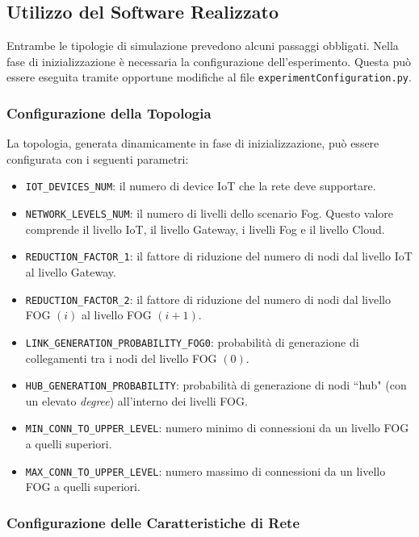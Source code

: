 \subsection{Utilizzo del Software Realizzato}

Entrambe le tipologie di simulazione prevedono alcuni passaggi obbligati. Nella fase di inizializzazione è necessaria la configurazione dell'esperimento. Questa può essere eseguita tramite opportune modifiche al file \texttt{\justify experimentConfiguration.py}.

\subsubsection{Configurazione della Topologia}

La topologia, generata dinamicamente in fase di inizializzazione, può essere configurata con i seguenti parametri:
\begin{itemize}
	\item \texttt{IOT\_DEVICES\_NUM}: il numero di device IoT che la rete deve supportare.
	\item \texttt{NETWORK\_LEVELS\_NUM}: il numero di livelli dello scenario Fog. Questo valore comprende il livello IoT, il livello Gateway, i livelli Fog e il livello Cloud.
	\item \texttt{REDUCTION\_FACTOR\_1}: il fattore di riduzione del numero di nodi dal livello IoT al livello Gateway.
	\item \texttt{REDUCTION\_FACTOR\_2}: il fattore di riduzione del numero di nodi dal livello FOG $(i)$ al livello FOG $(i+1)$.
	\item \texttt{LINK\_GENERATION\_PROBABILITY\_FOG0}: probabilità di generazione di collegamenti tra i nodi del livello FOG $(0)$.
	\item \texttt{HUB\_GENERATION\_PROBABILITY}: probabilità di generazione di nodi ``hub" (con un elevato \textit{degree}) all'interno dei livelli FOG. 
	\item \texttt{MIN\_CONN\_TO\_UPPER\_LEVEL}: numero minimo di connessioni da un livello FOG a quelli superiori.
	\item \texttt{MAX\_CONN\_TO\_UPPER\_LEVEL}: numero massimo di connessioni da un livello FOG a quelli superiori.
\end{itemize}

\subsubsection{Configurazione delle Caratteristiche di Rete}

